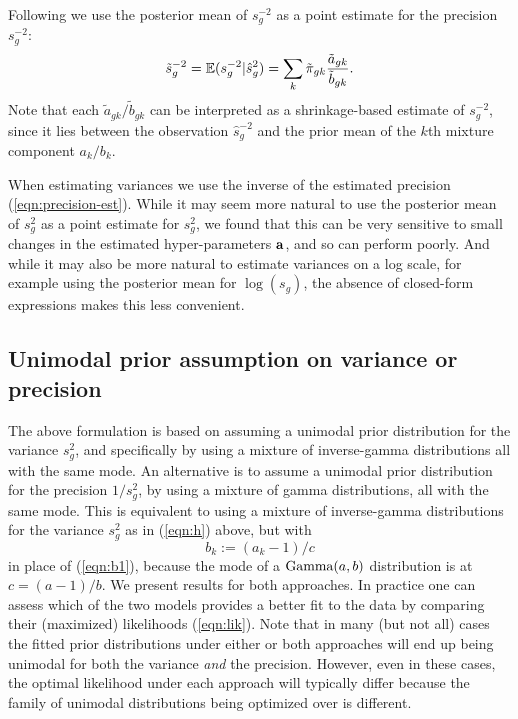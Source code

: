 \documentclass{bioinfo}
\begin{document}
\begin{methods}
Following \citet{smyth2004limma} we use the posterior mean of $s_g^{-2}$ as a point estimate for the precision $s_g^{-2}$:
\begin{equation} \label{eqn:precision-est}
\tilde{s}_g^{-2}=\mathbb{E}(s_g^{-2}|\hat{s}_g^2)=\sum_k \tilde{\pi}_{gk}\frac{\tilde{a}_{gk}}{\tilde{b}_{gk}}.
\end{equation}
Note that each ${\tilde{a}_{gk}}/{\tilde{b}_{gk}}$ can be interpreted as a shrinkage-based estimate of $s_g^{-2}$,
since it lies between the observation $\hat{s}_g^{-2}$ and the prior mean of the $k$th mixture component $a_k/b_k$.

When estimating variances we use the inverse of the estimated precision (\ref{eqn:precision-est}).
While it may seem more natural to use the posterior mean of $s_g^2$ as a point estimate for $s_g^2$, we found that this can be very sensitive
to small changes in the estimated hyper-parameters $\mathbf a$, and so can perform poorly.
And while it may also be more natural to estimate variances on a log scale, for example using the posterior mean for $\log(s_g)$,
the absence of closed-form expressions makes this less convenient.

\subsection{Unimodal prior assumption on variance or precision}

The above formulation is based on assuming a unimodal prior distribution for the variance $s_g^2$,
and specifically by using a mixture of inverse-gamma distributions all with the same mode.
An alternative is to assume a unimodal prior distribution for the precision $1/s_g^2$,
by using a mixture of gamma distributions, all with the same mode. 
This is equivalent to using a mixture
of inverse-gamma distributions for the variance $s_g^2$ as in (\ref{eqn:h}) above, but with
\begin{equation}
b_k:= (a_k-1)/c \label{eqn:b2}
\end{equation}
in place of (\ref{eqn:b1}), because the mode of a $\textrm{Gamma}(a,b)$ distribution is at $c=(a-1)/b$.
We present results for both approaches. In practice one can assess which of the two models provides
a better fit to the data by comparing their (maximized) likelihoods (\ref{eqn:lik}).
 Note that in many (but not all) cases the fitted prior distributions under either or both approaches 
will end up being unimodal for both the variance {\it and} the precision. However, even in these cases,
the optimal likelihood under each approach will typically differ because the family of unimodal distributions 
being optimized over is different. 

\enlargethispage{6pt}

\end{methods}
\end{document}
